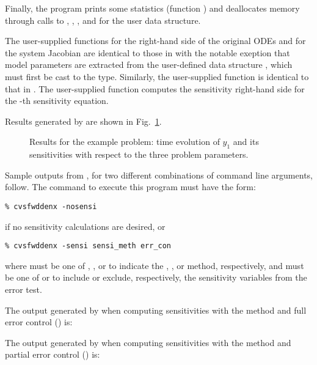 Finally, the program prints some statistics (function ) 
and deallocates memory through calls
to , , 
, and  for the user data structure.

The user-supplied functions  for the right-hand side of the original ODEs and
 for the system Jacobian are identical to those in  with the 
notable exeption that model parameters are extracted from the user-defined data structure
, which must first be cast to the  type. Similarly, the
user-supplied function  is identical to that in .
The user-supplied function  computes the sensitivity right-hand side for the -th 
sensitivity equation.

Results generated by  are shown in Fig.~\ref{f:cvsfwddenx}. 
\begin{figure}
  {\centerline{}}
  \caption{Results for the  example problem:
    time evolution of $y_1$ and its sensitivities with respect to the
    three problem parameters.}
  \label{f:cvsfwddenx}
\end{figure}
Sample outputs from , for two different combinations of command line arguments, 
follow. The command to execute this program must have the form:
\begin{verbatim}
% cvsfwddenx -nosensi
\end{verbatim} 
if no sensitivity calculations are desired, or
\begin{verbatim}
% cvsfwddenx -sensi sensi_meth err_con
\end{verbatim}
where  must be one of , , or  to
indicate the , , or  method,
respectively, and  must be one of  or  to
include or exclude, respectively, the sensitivity variables from the error test.

The output generated by  when computing sensitivities with the 
method and full error control () is:


The output generated by  when computing sensitivities with the 
method and partial error control () is:

